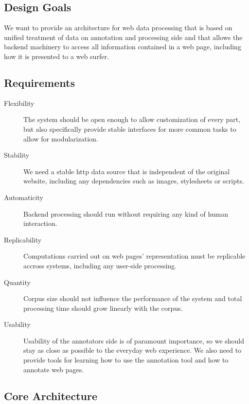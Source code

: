 \subsection{Design Goals}

We want to provide an architecture for web data processing that is based on unified treatment of data on annotation and processing side
and that allows the backend machinery to access all information contained in a web page, including how it is presented to a web surfer.

\subsection{Requirements}

\begin{description}

\item[Flexibility]
The system should be open enough to allow customization of every part, but also specifically provide stable interfaces for more common tasks to allow for modularization.

\item[Stability]
We need a stable http data source that is independent of the original website, including any dependencies such as images, stylesheets or scripts.

\item[Automaticity]
Backend processing should run without requiring any kind of human interaction.

\item[Replicability]
Computations carried out on web pages' representation must be replicable accross systems, including any user-side processing.

\item[Quantity]
Corpus size should not influence the performance of the system and total processing time should grow linearly with the corpus.

\item[Usability]
Usability of the annotators side is of paramount importance, so we should stay as close as possible to the everyday web experience.
We also need to provide tools for learning how to use the annotation tool and how to annotate web pages.

\end{description}

\subsection{Core Architecture}

